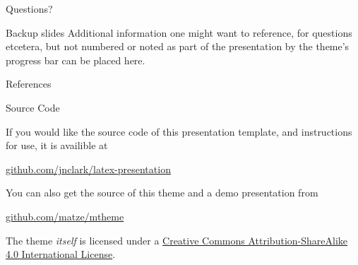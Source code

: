 \begin{frame}[standout]
  Questions?
\end{frame}

\appendix

\begin{frame}[fragile]{Backup slides}
  Additional information one might want to reference, for questions etcetera, but not numbered or noted as part of the presentation by the theme's progress bar can be placed here.
\end{frame}

\begin{frame}[allowframebreaks]{References}

  
  

\end{frame}

\begin{frame}{Source Code}

  If you would like the source code of this presentation template, and instructions for use, it is availible at 

  \begin{center}\url{github.com/jnclark/latex-presentation}\end{center}

  You can also get the source of this theme and a demo presentation from

  \begin{center}\url{github.com/matze/mtheme}\end{center}

  The theme \emph{itself} is licensed under a
  \href{http://creativecommons.org/licenses/by-sa/4.0/}{Creative Commons
  Attribution-ShareAlike 4.0 International License}.

  \begin{center}\ccbysa\end{center}
\end{frame}


